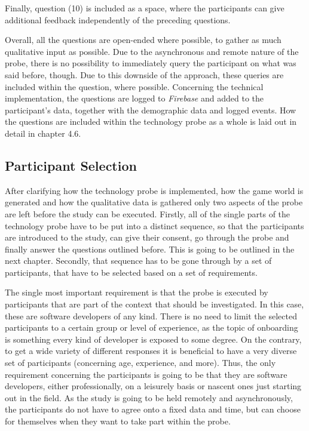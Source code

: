Finally, question (10) is included as a space, where the participants can give additional feedback independently of the preceding questions.

Overall, all the questions are open-ended where possible, to gather as much qualitative input as possible. Due to the asynchronous and remote nature of the probe, there is no possibility to immediately query the participant on what was said before, though. Due to this downside of the approach, these queries are included within the question, where possible. Concerning the technical implementation, the questions are logged to \textit{Firebase} and added to the participant's data, together with the demographic data and logged events. How the questions are included within the technology probe as a whole is laid out in detail in chapter 4.6.

\subsection{Participant Selection}

After clarifying how the technology probe is implemented, how the game world is generated and how the qualitative data is gathered only two aspects of the probe are left before the study can be executed. Firstly, all of the single parts of the technology probe have to be put into a distinct sequence, so that the participants are introduced to the study, can give their consent, go through the probe and finally answer the questions outlined before. This is going to be outlined in the next chapter. Secondly, that sequence has to be gone through by a set of participants, that have to be selected based on a set of requirements.

The single most important requirement is that the probe is executed by participants that are part of the context that should be investigated. In this case, these are software developers of any kind. There is no need to limit the selected participants to a certain group or level of experience, as the topic of onboarding is something every kind of developer is exposed to some degree. On the contrary, to get a wide variety of different responses it is beneficial to have a very diverse set of participants (concerning age, experience, and more). Thus, the only requirement concerning the participants is going to be that they are software developers, either professionally, on a leisurely basis or nascent ones just starting out in the field. As the study is going to be held remotely and asynchronously, the participants do not have to agree onto a fixed data and time, but can choose for themselves when they want to take part within the probe.

